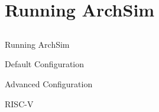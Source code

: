 \section{Running ArchSim}
\subsection{}

\begin{frame}{Running ArchSim}

\end{frame}

\begin{frame}{Default Configuration}

\end{frame}

\begin{frame}{Advanced Configuration}

\end{frame}

\begin{frame}{RISC-V}

\end{frame}
